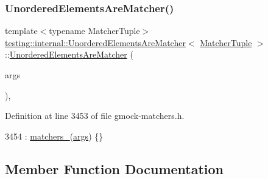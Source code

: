\subsubsection{\texorpdfstring{Unordered\+Elements\+Are\+Matcher()}{UnorderedElementsAreMatcher()}}
{\footnotesize\ttfamily template$<$typename Matcher\+Tuple$>$ \\
\hyperlink{classtesting_1_1internal_1_1UnorderedElementsAreMatcher}{testing\+::internal\+::\+Unordered\+Elements\+Are\+Matcher}$<$ \hyperlink{structtesting_1_1internal_1_1MatcherTuple}{Matcher\+Tuple} $>$\+::\hyperlink{classtesting_1_1internal_1_1UnorderedElementsAreMatcher}{Unordered\+Elements\+Are\+Matcher} (\begin{DoxyParamCaption}\item[{const \hyperlink{structtesting_1_1internal_1_1MatcherTuple}{Matcher\+Tuple} \&}]{args }\end{DoxyParamCaption})\hspace{0.3cm}{\ttfamily [inline]}, {\ttfamily [explicit]}}



Definition at line 3453 of file gmock-\/matchers.\+h.


\begin{DoxyCode}
3454       : \hyperlink{classtesting_1_1internal_1_1UnorderedElementsAreMatcher_acfcd56f88943d922d7e7ecd8d9c5eb9f}{matchers\_}(\hyperlink{namespacegenerate__debs_a75f9143e38df82d83b2e8a6f99cae02c}{args}) \{\}
\end{DoxyCode}


\subsection{Member Function Documentation}
\mbox{\label{classtesting_1_1internal_1_1UnorderedElementsAreMatcher_a7735afd5dd74513f0dd14da5d2e3bec3}} 
